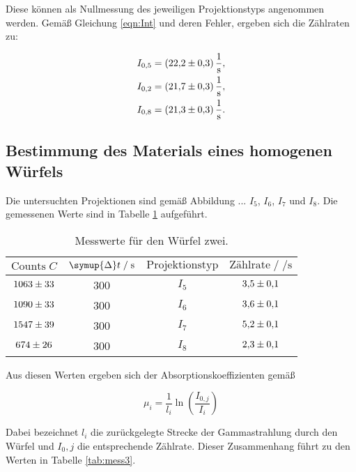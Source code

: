Diese können als Nullmessung des jeweiligen Projektionstyps angenommen werden. Gemäß Gleichung \eqref{eqn:Int} und deren Fehler, ergeben
sich die Zählraten zu: 

\begin{align*}
  I_{0,5} &= \SI{22.2+-0.3}{\per\second},\\ 
  I_{0,2} &= \SI{21.7+-0.3}{\per\second},\\ 
  I_{0,8} &= \SI{21.3+-0.3}{\per\second}.   
\end{align*}

\subsection{Bestimmung des Materials eines homogenen Würfels}

Die untersuchten Projektionen sind gemäß Abbildung ... $I_5$, $I_6$, $I_7$ und $I_8$. Die gemessenen Werte sind in 
Tabelle \ref{tab:mess2} aufgeführt. 

\begin{table}[H]
  \centering
  \caption{Messwerte für den Würfel zwei.}
  \label{tab:mess2}
  \begin{tabular}{c c c c}
  \toprule
  $\text{Counts} \; C$ & $\symup{\Delta} t \;/\; \si{\second}$ & $\text{Projektionstyp}$ & $\text{Zählrate} \;/\; \si{\per\second}$\\
  \midrule
      $\num{1063+-33}$ & 300 & $I_{5}$ & $\num{3.5+-0.1}$\\
      $\num{1090+-33}$ & 300 & $I_{6}$ & $\num{3.6+-0.1}$\\
      $\num{1547+-39}$ & 300 & $I_{7}$ & $\num{5.2+-0.1}$\\
      $\num{674+-26}$ & 300 & $I_{8}$  & $\num{2.3+-0.1}$\\
  \bottomrule
  \end{tabular}
\end{table}

Aus diesen Werten ergeben sich der Absorptionskoeffizienten gemäß 

\begin{equation*}
  \mu_i = \frac{1}{l_i}\ln{\left(\frac{I_{0,j}}{I_i}\right)}
\end{equation*}

Dabei bezeichnet $l_i$ die zurückgelegte Strecke der Gammastrahlung durch den Würfel und $I_0,j$ die entsprechende Zählrate. Dieser 
Zusammenhang führt zu den Werten in Tabelle \ref{tab:mess3}.

